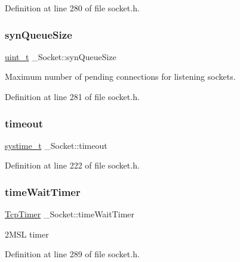 Definition at line 280 of file socket.\+h.

\mbox{\label{struct__Socket_a2659006107e539262135066dfb8d5bd8}} 
\subsubsection{\texorpdfstring{syn\+Queue\+Size}{synQueueSize}}
{\footnotesize\ttfamily \hyperlink{compiler__port_8h_a12a1e9b3ce141648783a82445d02b58d}{uint\+\_\+t} \+\_\+\+Socket\+::syn\+Queue\+Size}



Maximum number of pending connections for listening sockets. 



Definition at line 281 of file socket.\+h.

\mbox{\label{struct__Socket_af161e3cd809e55347bfe382c7899d98d}} 
\subsubsection{\texorpdfstring{timeout}{timeout}}
{\footnotesize\ttfamily \hyperlink{compiler__port_8h_ae3e32a98d431a02106616da3071832dd}{systime\+\_\+t} \+\_\+\+Socket\+::timeout}



Definition at line 222 of file socket.\+h.

\mbox{\label{struct__Socket_a83c1b62649de205f0e9be9798e721378}} 
\subsubsection{\texorpdfstring{time\+Wait\+Timer}{timeWaitTimer}}
{\footnotesize\ttfamily \hyperlink{structTcpTimer}{Tcp\+Timer} \+\_\+\+Socket\+::time\+Wait\+Timer}



2\+M\+SL timer 



Definition at line 289 of file socket.\+h.

